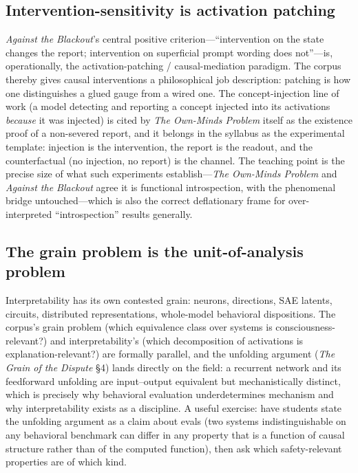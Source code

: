 \documentclass[11pt]{article}
\newcommand{\GD}{\emph{The Grain of the Dispute}}
\newcommand{\OM}{\emph{The Own-Minds Problem}}
\newcommand{\AB}{\emph{Against the Blackout}}
\begin{document}
\subsection{Intervention-sensitivity is activation patching}
\AB{}'s central positive criterion---``intervention on the state changes the report; intervention on superficial prompt wording does not''---is, operationally, the activation-patching / causal-mediation paradigm. The corpus thereby gives causal interventions a philosophical job description: patching is how one distinguishes a glued gauge from a wired one. The concept-injection line of work (a model detecting and reporting a concept injected into its activations \emph{because} it was injected) is cited by \OM{} itself as the existence proof of a non-severed report, and it belongs in the syllabus as the experimental template: injection is the intervention, the report is the readout, and the counterfactual (no injection, no report) is the channel. The teaching point is the precise size of what such experiments establish---\OM{} and \AB{} agree it is functional introspection, with the phenomenal bridge untouched---which is also the correct deflationary frame for over-interpreted ``introspection'' results generally.

\subsection{The grain problem is the unit-of-analysis problem}
Interpretability has its own contested grain: neurons, directions, SAE latents, circuits, distributed representations, whole-model behavioral dispositions. The corpus's grain problem (which equivalence class over systems is consciousness-relevant?) and interpretability's (which decomposition of activations is explanation-relevant?) are formally parallel, and the unfolding argument (\GD{} \S 4) lands directly on the field: a recurrent network and its feedforward unfolding are input--output equivalent but mechanistically distinct, which is precisely why behavioral evaluation underdetermines mechanism and why interpretability exists as a discipline. A useful exercise: have students state the unfolding argument as a claim about evals (two systems indistinguishable on any behavioral benchmark can differ in any property that is a function of causal structure rather than of the computed function), then ask which safety-relevant properties are of which kind.
\end{document}
